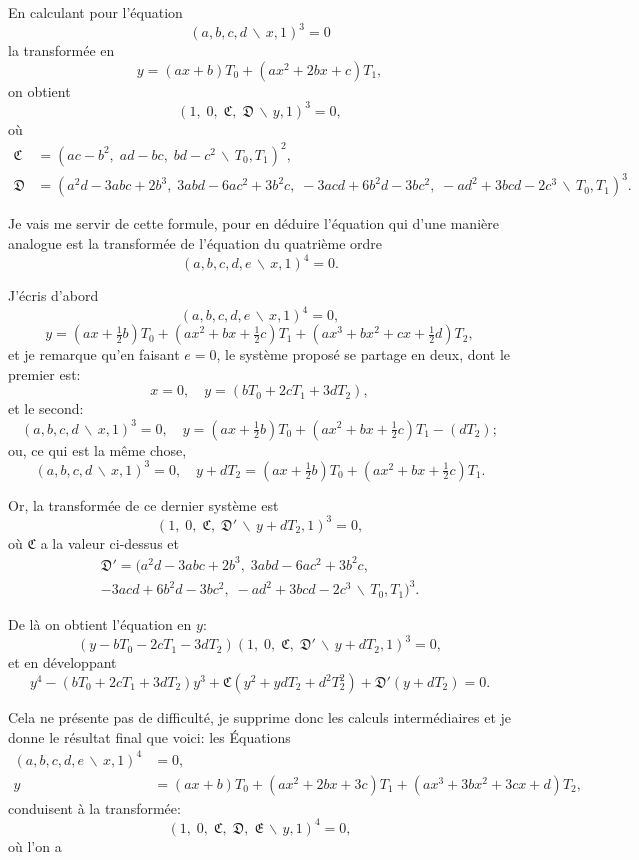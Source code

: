 \documentclass[11pt,a4paper]{article}
\theoremstyle{definition}
\begin{document}
En calculant pour l'\'{e}quation
\[(a,b,c,d\,\backslash\!\!\,x,1)^{3} = 0\]
la transform\'{e}e en
\[y = (ax+b)T_{0} + (ax^{2}+2bx+c)T_{1},\]
on obtient
\[(1,\; 0,\; \mathfrak{C},\; \mathfrak{D}\,\backslash\!\!\,y,1)^{3} = 0,\]
o\`{u}
\begin{align*}
\mathfrak{C} &= (ac-b^{2},\; ad-bc,\; bd-c^{2}\,\backslash\!\!\,T_{0},T_{1})^{2},\\
\mathfrak{D} &= (a^{2}d-3abc+2b^{3},\; 3abd-6ac^{2}+3b^{2}c,\; -3acd+6b^{2}d-3bc^{2},\; -ad^{2}+3bcd-2c^{3}\,\backslash\!\!\,T_{0},T_{1})^{3}.
\end{align*}

Je vais me servir de cette formule, pour en d\'{e}duire l'\'{e}quation qui d'une mani\`{e}re
analogue est la transform\'{e}e de l'\'{e}quation du quatri\`{e}me ordre
\[(a,b,c,d,e\,\backslash\!\!\,x,1)^{4} = 0.\]

J'\'{e}cris d'abord
\[(a,b,c,d,e\,\backslash\!\!\,x,1)^{4} = 0,\]
\[y = (ax+\tfrac{1}{2}b)T_{0} + (ax^{2}+bx+\tfrac{1}{2}c)T_{1} + (ax^{3}+bx^{2}+cx+\tfrac{1}{2}d)T_{2},\]
et je remarque qu'en faisant $e=0$, le syst\`{e}me propos\'{e} se partage en deux, dont
le premier est:
\[x = 0, \quad y = (bT_{0}+2cT_{1}+3dT_{2}),\]
et le second:
\[(a,b,c,d\,\backslash\!\!\,x,1)^{3} = 0, \quad y = (ax+\tfrac{1}{2}b)T_{0} + (ax^{2}+bx+\tfrac{1}{2}c)T_{1} - (dT_{2});\]
ou, ce qui est la m\^{e}me chose,
\[(a,b,c,d\,\backslash\!\!\,x,1)^{3} = 0, \quad y + dT_{2} = (ax+\tfrac{1}{2}b)T_{0} + (ax^{2}+bx+\tfrac{1}{2}c)T_{1}.\]

Or, la transform\'{e}e de ce dernier syst\`{e}me est
\[(1,\; 0,\; \mathfrak{C},\; \mathfrak{D}'\,\backslash\!\!\,y+dT_{2},1)^{3} = 0,\]
o\`{u} $\mathfrak{C}$ a la valeur ci-dessus et
\begin{multline*}
\mathfrak{D}' = (a^{2}d-3abc+2b^{3},\; 3abd-6ac^{2}+3b^{2}c, \\
-3acd+6b^{2}d-3bc^{2},\; -ad^{2}+3bcd-2c^{3}\,\backslash\!\!\,T_{0},T_{1})^{3}.
\end{multline*}

De l\`{a} on obtient l'\'{e}quation en $y$:
\[(y-bT_{0}-2cT_{1}-3dT_{2})(1,\; 0,\; \mathfrak{C},\; \mathfrak{D}'\,\backslash\!\!\,y+dT_{2},1)^{3} = 0,\]
et en d\'{e}veloppant
\[y^{4} - (bT_{0}+2cT_{1}+3dT_{2})y^{3} + \mathfrak{C}(y^{2}+ydT_{2}+d^{2}T_{2}^{2}) + \mathfrak{D}'(y+dT_{2}) = 0.\]

Cela ne pr\'{e}sente pas de difficult\'{e}, je supprime donc les calculs interm\'{e}diaires
et je donne le r\'{e}sultat final que voici: les \'{E}quations
\begin{align*}
(a,b,c,d,e\,\backslash\!\!\,x,1)^{4} &= 0,\\
y &= (ax+b)T_{0} + (ax^{2}+2bx+3c)T_{1} + (ax^{3}+3bx^{2}+3cx+d)T_{2},
\end{align*}
conduisent \`{a} la transform\'{e}e:
\[(1,\; 0,\; \mathfrak{C},\; \mathfrak{D},\; \mathfrak{E}\,\backslash\!\!\,y,1)^{4} = 0,\]
o\`{u} l'on a
\end{document}
